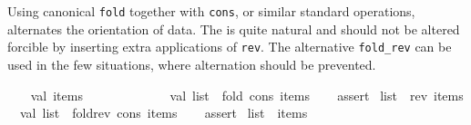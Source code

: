 \begin{isabellebody}
\begin{isamarkuptext}
\begin{description}
  \end{description}%
\end{isamarkuptext}%
\isamarkuptrue%
%
\endisatagmlref
{\isafoldmlref}%
%
\isadelimmlref
%
\endisadelimmlref
%
\isadelimmlex
%
\endisadelimmlex
%
\isatagmlex
%
\begin{isamarkuptext}%
Using canonical \verb|fold| together with \verb|cons|, or
  similar standard operations, alternates the orientation of data.
  The is quite natural and should not be altered forcible by inserting
  extra applications of \verb|rev|.  The alternative \verb|fold_rev| can
  be used in the few situations, where alternation should be
  prevented.%
\end{isamarkuptext}%
\isamarkuptrue%
%
\endisatagmlex
{\isafoldmlex}%
%
\isadelimmlex
%
\endisadelimmlex
%
\isadelimML
%
\endisadelimML
%
\isatagML
{}\isamarkupfalse%
\ {}\isanewline
\ \ val\ items\ {}\ {}{}{}\ {}{}\ {}{}\ {}{}\ {}{}\ {}{}\ {}{}\ {}{}\ {}{}\ {}{}{}{}\isanewline
\isanewline
\ \ val\ list{}\ {}\ fold\ cons\ items\ {}{}{}\isanewline
\ \ %
\isaantiq
assert{}%
\endisaantiq
\ {}list{}\ {}\ rev\ items{}{}\isanewline
\isanewline
\ \ val\ list{}\ {}\ fold{}rev\ cons\ items\ {}{}{}\isanewline
\ \ %
\isaantiq
assert{}%
\endisaantiq
\ {}list{}\ {}\ items{}{}\isanewline
{}%
\endisatagML
{\isafoldML}%
%
\isadelimML
%
\endisadelimML
%
\begin{isamarkuptext}%

\end{isamarkuptext}
\end{isabellebody}
